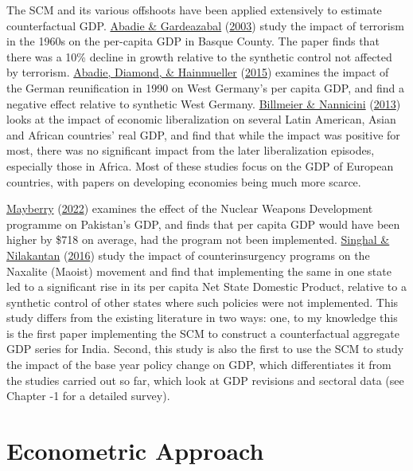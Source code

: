 \documentclass[12pt,nobind, a4paper]{reedthesis}
\begin{document}
 The SCM and its various offshoots have been applied extensively to estimate counterfactual GDP. \protect\hyperlink{ref-abadie_economic_2003}{Abadie \& Gardeazabal} (\protect\hyperlink{ref-abadie_economic_2003}{2003}) study the impact of terrorism in the 1960s on the per-capita GDP in Basque County. The paper finds that there was a 10\% decline in growth relative to the synthetic control not affected by terrorism. \protect\hyperlink{ref-abadie_comparative_2015}{Abadie, Diamond, \& Hainmueller} (\protect\hyperlink{ref-abadie_comparative_2015}{2015}) examines the impact of the German reunification in 1990 on West Germany's per capita GDP, and find a negative effect relative to synthetic West Germany. \protect\hyperlink{ref-billmeier_assessing_2013}{Billmeier \& Nannicini} (\protect\hyperlink{ref-billmeier_assessing_2013}{2013}) looks at the impact of economic liberalization on several Latin American, Asian and African countries' real GDP, and find that while the impact was positive for most, there was no significant impact from the later liberalization episodes, especially those in Africa. Most of these studies focus on the GDP of European countries, with papers on developing economies being much more scarce.
 \linebreak

 \protect\hyperlink{ref-mayberry_economic_2022}{Mayberry} (\protect\hyperlink{ref-mayberry_economic_2022}{2022}) examines the effect of the Nuclear Weapons Development programme on Pakistan's GDP, and finds that per capita GDP would have been higher by \$718 on average, had the program not been implemented. \protect\hyperlink{ref-singhal_economic_2016}{Singhal \& Nilakantan} (\protect\hyperlink{ref-singhal_economic_2016}{2016}) study the impact of counterinsurgency programs on the Naxalite (Maoist) movement and find that implementing the same in one state led to a significant rise in its per capita Net State Domestic Product, relative to a synthetic control of other states where such policies were not implemented. This study differs from the existing literature in two ways: one, to my knowledge this is the first paper implementing the SCM to construct a counterfactual aggregate GDP series for India. Second, this study is also the first to use the SCM to study the impact of the base year policy change on GDP, which differentiates it from the studies carried out so far, which look at GDP revisions and sectoral data (see Chapter -1 for a detailed survey).

 \hypertarget{ec}{%
 \section{Econometric Approach}\label{ec}}
\end{document}
